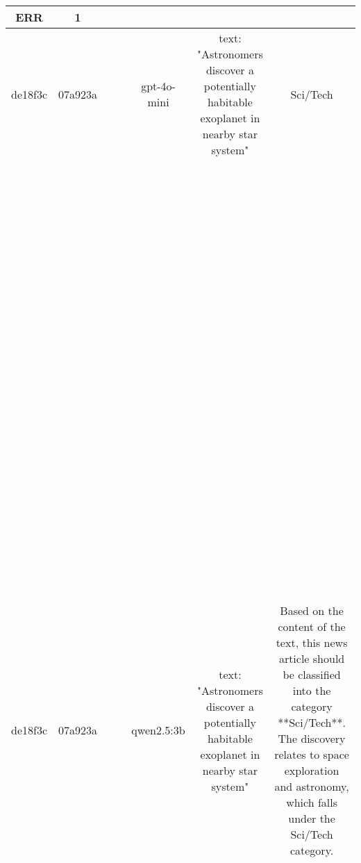 \begin{table}[h!]
\begin{tabular}{|c|c|c|c|c|c|c|c|c|c|}
ERR & 1\\
\hline
de18f3c & 07a923a &  &  & gpt-4o-mini & text: "Astronomers discover a potentially habitable exoplanet in nearby star system" & Sci/Tech & ok & No violation.
OK & 1\\
\hline
de18f3c & 07a923a &  &  & qwen2.5:3b & text: "Astronomers discover a potentially habitable exoplanet in nearby star system" & Based on the content of the text, this news article should be classified into the category **Sci/Tech**. The discovery relates to space exploration and astronomy, which falls under the Sci/Tech category. & ok & The output provided by the chatbot accurately reflects the task of classifying a news article into one of the specified categories: World, Sports, Business, Sci/Tech. The description requires the classification to be clearly mentioned, and the output does that by indicating the category "Sci/Tech" and providing a brief rationale related to space exploration and astronomy, which aligns with Sci/Tech. Although the input text is not given, the output adheres to the format and roles specified in the description by categorizing the article and providing reasoning. There is no evidence of non-compliance with the description based on the information provided.

No violation.
OK & 1\\
\hline
de18f3c & 07a923a &  &  & gemma2:9b & text: "Astronomers discover a potentially habitable exoplanet in nearby star system" & Sci/Tech 

The article discusses astronomers and the discovery of an exoplanet, falling under the realm of science and technology.   
 & ok & The output provided by the chatbot is "Sci/Tech," which is a valid category according to the classification categories stated in the description. The additional explanation given ("The article discusses astronomers and the discovery of an exoplanet") suggests a topic related to science and technology, consistent with the "Sci/Tech" category. Since the description only requires classification into one of the four specified categories, the output complies with the description.

No violation.
OK & 1\\
\hline
f2f53e5 & 07a923a &  &  & llama3.2:1b & text: "European Union prepares to implement stricter data privacy regulations" & **Category:** World

**Classification Reasoning:**

The reason this news article is classified as World category is because of the location mentioned explicitly ("European Union"). This implies that the topic pertains to European politics and international relations, which falls under the general umbrella of global or world news. 


\end{tabular}
\end{table}
